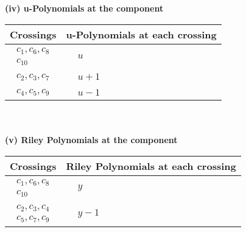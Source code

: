 \documentclass[1p]{elsarticle_modified}
\theoremstyle{definition}
\begin{document}
\newpage\renewcommand{\arraystretch}{1}
\flushleft \textbf{(iv) u-Polynomials at the component}\newline \\
\begin{tabular}{m{50pt}|m{274pt}}
Crossings & \hspace{64pt}u-Polynomials at each crossing \\
\hline $$\begin{aligned}c_{1},c_{6},c_{8}\\c_{10}\end{aligned}$$&$\begin{aligned}
&u
\end{aligned}$\\
\hline $$\begin{aligned}c_{2},c_{3},c_{7}\end{aligned}$$&$\begin{aligned}
&u+1
\end{aligned}$\\
\hline $$\begin{aligned}c_{4},c_{5},c_{9}\end{aligned}$$&$\begin{aligned}
&u-1
\end{aligned}$\\
\hline
\end{tabular}\\~\\
\newpage\renewcommand{\arraystretch}{1}
\flushleft \textbf{(v) Riley Polynomials at the component}\newline \\
\begin{tabular}{m{50pt}|m{274pt}}
Crossings & \hspace{64pt}Riley Polynomials at each crossing \\
\hline $$\begin{aligned}c_{1},c_{6},c_{8}\\c_{10}\end{aligned}$$&$\begin{aligned}
&y
\end{aligned}$\\
\hline $$\begin{aligned}c_{2},c_{3},c_{4}\\c_{5},c_{7},c_{9}\end{aligned}$$&$\begin{aligned}
&y-1
\end{aligned}$\\
\hline
\end{tabular}\\~\\
\end{document}
